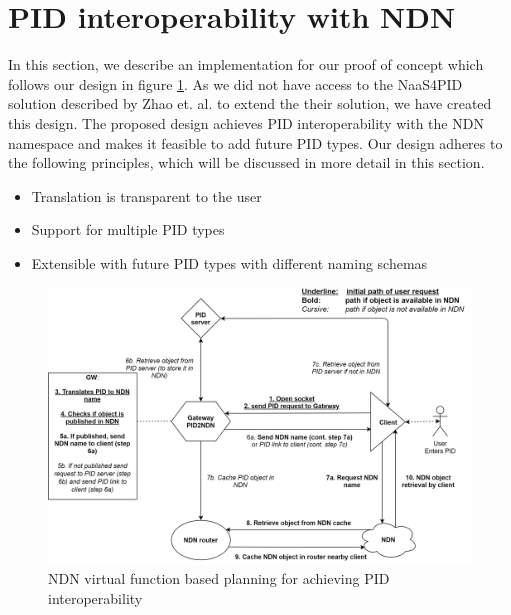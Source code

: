 \section{PID interoperability with NDN}\label{pid-poc}

In this section, we describe an implementation for our proof of concept which follows our design in figure \ref{fig:sdc_model}. 
As we did not have access to the NaaS4PID solution described by Zhao et. al. to extend the their solution, we have created this design. The proposed design achieves PID interoperability with the NDN namespace and makes it feasible to add future PID types. Our design adheres to the following principles, which will be discussed in more detail in this section.

\begin{itemize}
    \item{Translation is transparent to the user}
    \item{Support for multiple PID types}
    \item{Extensible with future PID types with different naming schemas}
\end{itemize}

\begin{figure}[H]
\centering
\includegraphics[width=\textwidth]{Images/PIDtoNDN10.png}
\caption{NDN virtual function based 
planning for achieving PID interoperability}
\label{fig:sdc_model}
\end{figure}


